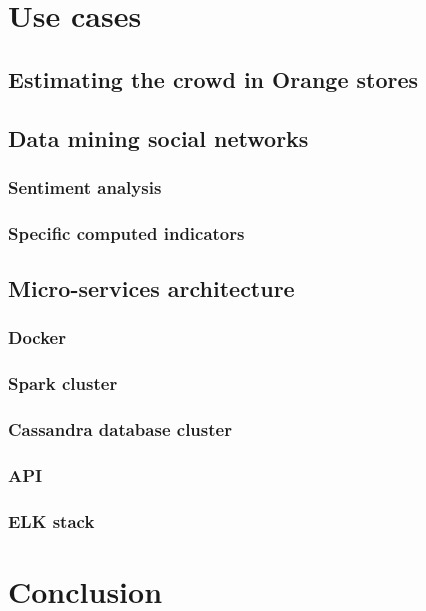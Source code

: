 \documentclass[11pt]{article}
\begin{document}
\section{Use cases}
\subsection{Estimating the crowd in Orange stores}

\subsection{Data mining social networks}
\subsubsection{Sentiment analysis}

\subsubsection{Specific computed indicators}

\subsection{Micro-services architecture}


\subsubsection{Docker}

\subsubsection{Spark cluster}

\subsubsection{Cassandra database cluster}

\subsubsection{API}

\subsubsection{ELK stack}

\section{Conclusion}



\end{document}
